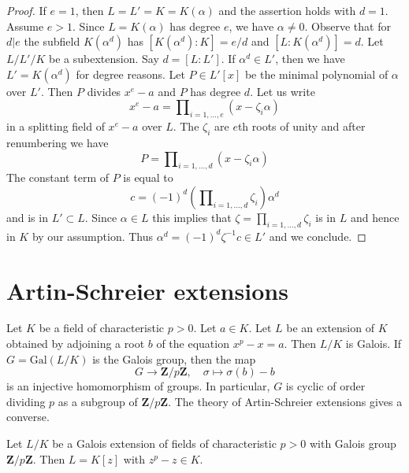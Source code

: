 \begin{proof}
If $e=1$, then $L=L'=K=K(\alpha)$ and the assertion holds with
$d=1$. Assume $e>1$. Since $L=K(\alpha)$ has degree $e$, we have
$\alpha\not =0$. Observe that for $d | e$ the subfield $K(\alpha^d)$ has
$[K(\alpha^d) : K] = e/d$ and $[L : K(\alpha^d)] = d$.
Let $L/L'/K$ be a subextension. Say $d = [L : L']$. If $\alpha^d \in L'$,
then we have $L' = K(\alpha^d)$ for degree reasons.
Let $P \in L'[x]$ be the minimal polynomial of $\alpha$ over $L'$.
Then $P$ divides $x^e - a$ and $P$ has degree $d$.
Let us write
$$
x^e - a = \prod\nolimits_{i = 1, \ldots, e} (x - \zeta_i \alpha)
$$
in a splitting field of $x^e - a$ over $L$. The $\zeta_i$ are $e$th roots
of unity and after renumbering we have
$$
P = \prod\nolimits_{i = 1, \ldots, d} (x - \zeta_i \alpha)
$$
The constant term of $P$ is equal to
$$
c = (-1)^d (\prod\nolimits_{i = 1, \ldots, d} \zeta_i) \alpha^d
$$
and is in $L' \subset L$. Since $\alpha \in L$ this implies that
$\zeta = \prod_{i = 1, \ldots, d} \zeta_i$ is in $L$ and hence in $K$ by
our assumption. Thus $\alpha^d = (-1)^d\zeta^{-1}c \in L'$ and we conclude.
\end{proof}




\section{Artin-Schreier extensions}
\label{section-Artin-Schreier}

\noindent
Let $K$ be a field of characteristic $p > 0$. Let $a \in K$. Let $L$ be an
extension of $K$ obtained by adjoining a root $b$ of the equation
$x^p - x = a$. Then $L/K$ is Galois. If $G = \text{Gal}(L/K)$ is the Galois
group, then the map
$$
G \longrightarrow \mathbf{Z}/p\mathbf{Z},\quad
\sigma \longmapsto \sigma(b) - b
$$
is an injective homomorphism of groups. In particular, $G$ is cyclic
of order dividing $p$ as a subgroup of $\mathbf{Z}/p\mathbf{Z}$.
The theory of Artin-Schreier extensions gives a converse.

\begin{lemma}
\label{lemma-Artin-Schreier}
Let $L/K$ be a Galois extension of fields of characteristic $p > 0$
with Galois group $\mathbf{Z}/p\mathbf{Z}$. Then $L = K[z]$ with
$z^p - z \in K$.
\end{lemma}

